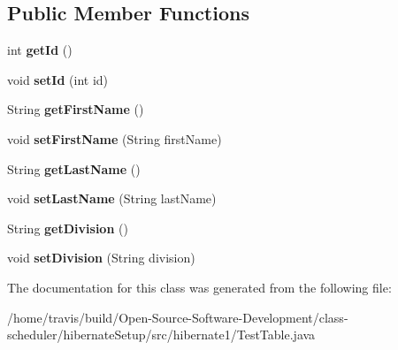 \subsection*{Public Member Functions}
\begin{DoxyCompactItemize}
\item 
\hypertarget{classhibernate1_1_1_test_table_af728065d4d2dd4f463434dd171be3a1b}{int {\bfseries get\-Id} ()}\label{classhibernate1_1_1_test_table_af728065d4d2dd4f463434dd171be3a1b}

\item 
\hypertarget{classhibernate1_1_1_test_table_ae440fd9fe93881027301fcc17ca2cdde}{void {\bfseries set\-Id} (int id)}\label{classhibernate1_1_1_test_table_ae440fd9fe93881027301fcc17ca2cdde}

\item 
\hypertarget{classhibernate1_1_1_test_table_a2d4f61cb8c64889bf633673c4985041d}{String {\bfseries get\-First\-Name} ()}\label{classhibernate1_1_1_test_table_a2d4f61cb8c64889bf633673c4985041d}

\item 
\hypertarget{classhibernate1_1_1_test_table_ab3bad26f58ae6ebe0312f2430c1cbe88}{void {\bfseries set\-First\-Name} (String first\-Name)}\label{classhibernate1_1_1_test_table_ab3bad26f58ae6ebe0312f2430c1cbe88}

\item 
\hypertarget{classhibernate1_1_1_test_table_a0ff3d75e7b9692928e5cfd72e3717928}{String {\bfseries get\-Last\-Name} ()}\label{classhibernate1_1_1_test_table_a0ff3d75e7b9692928e5cfd72e3717928}

\item 
\hypertarget{classhibernate1_1_1_test_table_a03e3e5395e928d366cd689869e8b8755}{void {\bfseries set\-Last\-Name} (String last\-Name)}\label{classhibernate1_1_1_test_table_a03e3e5395e928d366cd689869e8b8755}

\item 
\hypertarget{classhibernate1_1_1_test_table_a2ac7359341c8ba58f1468e942e46b0d1}{String {\bfseries get\-Division} ()}\label{classhibernate1_1_1_test_table_a2ac7359341c8ba58f1468e942e46b0d1}

\item 
\hypertarget{classhibernate1_1_1_test_table_a7630715bf4f2e4a8d64c41e569fd8571}{void {\bfseries set\-Division} (String division)}\label{classhibernate1_1_1_test_table_a7630715bf4f2e4a8d64c41e569fd8571}

\end{DoxyCompactItemize}


The documentation for this class was generated from the following file\-:\begin{DoxyCompactItemize}
\item 
/home/travis/build/\-Open-\/\-Source-\/\-Software-\/\-Development/class-\/scheduler/hibernate\-Setup/src/hibernate1/Test\-Table.\-java\end{DoxyCompactItemize}
